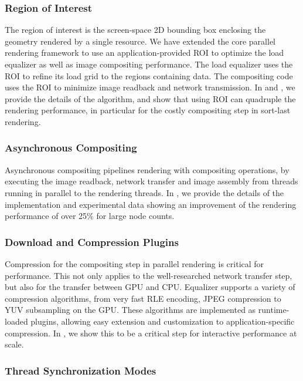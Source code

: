 \documentclass[10pt,journal,compsoc]{IEEEtran}
\begin{document}
\subsubsection{Region of Interest}

The region of interest is the screen-space 2D bounding box enclosing the
geometry rendered by a single resource. We have extended the core parallel
rendering framework to use an application-provided ROI to optimize the load
equalizer as well as image compositing performance. The load equalizer uses the
ROI to refine its load grid to the regions containing data. The compositing code
uses the ROI to minimize image readback and network transmission. In
\cite{MEP:10} and \cite{EBAHMP:12}, we provide the details of the algorithm, and
show that using ROI can quadruple the rendering performance, in particular for
the costly compositing step in sort-last rendering.

\subsubsection{Asynchronous Compositing}

Asynchronous compositing pipelines rendering with compositing operations, by
executing the image readback, network transfer and image assembly from threads
running in parallel to the rendering threads. In \cite{EBAHMP:12}, we provide
the details of the implementation and experimental data showing an improvement
of the rendering performance of over 25\% for large node counts.

\subsubsection{Download and Compression Plugins}

Compression for the compositing step in parallel rendering is critical for
performance. This not only applies to the well-researched network transfer step,
but also for the transfer between GPU and CPU. Equalizer supports a variety of
compression algorithms, from very fast RLE encoding, JPEG compression to YUV
subsampling on the GPU. These algorithms are implemented as runtime-loaded
plugins, allowing easy extension and customization to application-specific
compression. In \cite{MEP:10}, we show this to be a critical step for
interactive performance at scale.

\subsubsection{Thread Synchronization Modes}\label{sec:threading}
\end{document}
